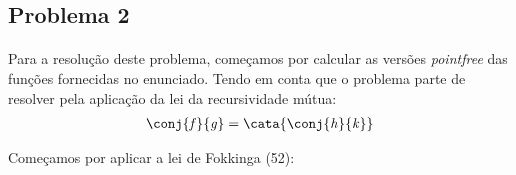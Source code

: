 \documentclass[a4paper]{article}
\newcommand{\Varid}[1]{\mathit{#1}}
\begin{document}
\newpage
\subsection*{Problema 2}
\paragraph{}
Para a resolução deste problema, começamos por calcular as versões \textit{pointfree} das funções fornecidas no enunciado.
Tendo em conta que o problema parte de resolver pela aplicação da lei da recursividade mútua:
\begin{eqnarray*}
\ensuremath{\conj{\Varid{f}}{\Varid{g}}\mathrel{=}\cata{\conj{\Varid{h}}{\Varid{k}}}}
\end{eqnarray*}

Começamos por aplicar a lei de Fokkinga (52):
\end{document}
